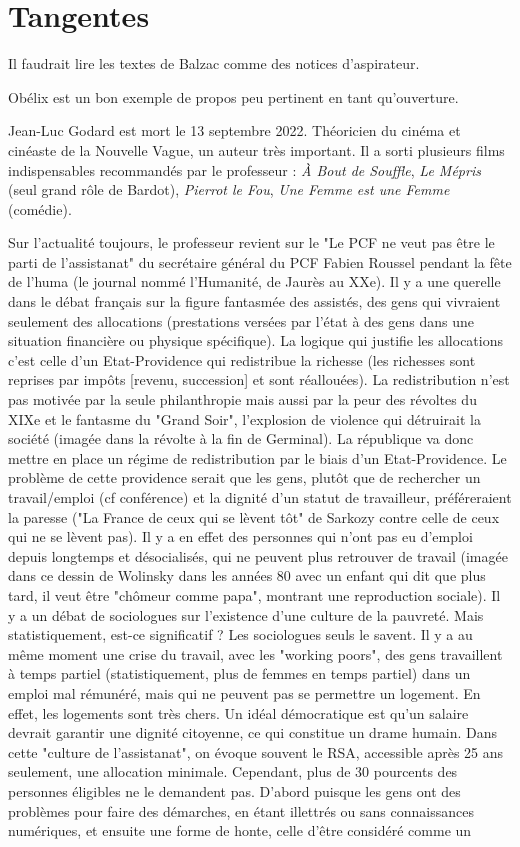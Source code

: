 \documentclass[a4paper,12pt]{book}
\begin{document}
\chapter{Tangentes}
Il faudrait lire les textes de Balzac comme des notices d'aspirateur.
\par Obélix est un bon exemple de propos peu pertinent en tant qu'ouverture.
\par Jean-Luc Godard est mort le 13 septembre 2022. Théoricien du cinéma et cinéaste de la Nouvelle Vague, un auteur très important. Il a sorti plusieurs films indispensables recommandés par le professeur : \textit{À Bout de Souffle}, \textit{Le Mépris} (seul grand rôle de Bardot), \textit{Pierrot le Fou}, \textit{Une Femme est une Femme} (comédie).
\par Sur l'actualité toujours, le professeur revient sur le "Le PCF ne veut pas être le parti de l'assistanat" du secrétaire général du PCF Fabien Roussel pendant la fête de l'huma (le journal nommé l'Humanité, de Jaurès au XXe). Il y a une querelle dans le débat français sur la figure fantasmée des assistés, des gens qui vivraient seulement des allocations (prestations versées par l'état à des gens dans une situation financière ou physique spécifique). La logique qui justifie les allocations c'est celle d'un Etat-Providence qui redistribue la richesse (les richesses sont reprises par impôts [revenu, succession] et sont réallouées). La redistribution n'est pas motivée par la seule philanthropie mais aussi par la peur des révoltes du XIXe et le fantasme du "Grand Soir", l'explosion de violence qui détruirait la société (imagée dans la révolte à la fin de Germinal). La république va donc mettre en place un régime de redistribution par le biais d'un Etat-Providence. Le problème de cette providence serait que les gens, plutôt que de rechercher un travail/emploi (cf conférence) et la dignité d'un statut de travailleur, préféreraient la paresse ("La France de ceux qui se lèvent tôt" de Sarkozy contre celle de ceux qui ne se lèvent pas). Il y a en effet des personnes qui n'ont pas eu d'emploi depuis longtemps et désocialisés, qui ne peuvent plus retrouver de travail (imagée dans ce dessin de Wolinsky dans les années 80 avec un enfant qui dit que plus tard, il veut être "chômeur comme papa", montrant une reproduction sociale). Il y a un débat de sociologues sur l'existence d'une culture de la pauvreté. Mais statistiquement, est-ce significatif ? Les sociologues seuls le savent. Il y a au même moment une crise du travail, avec les "working poors", des gens travaillent à temps partiel (statistiquement, plus de femmes en temps partiel) dans un emploi mal rémunéré, mais qui ne peuvent pas se permettre un logement. En effet, les logements sont très chers. Un idéal démocratique est qu'un salaire devrait garantir une dignité citoyenne, ce qui constitue un drame humain. Dans cette "culture de l'assistanat", on évoque souvent le RSA, accessible après 25 ans seulement, une allocation minimale. Cependant, plus de 30 pourcents des personnes éligibles ne le demandent pas. D'abord puisque les gens ont des problèmes pour faire des démarches, en étant illettrés ou sans connaissances numériques, et ensuite une forme de honte, celle d'être considéré comme un 
\end{document}
